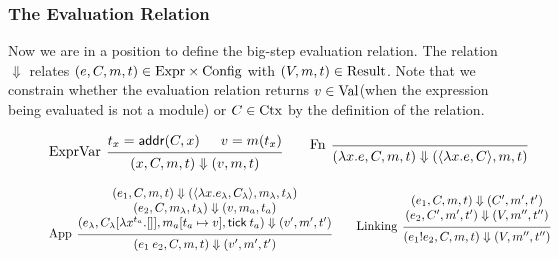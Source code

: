 \documentclass[acmsmall,screen,review]{acmart}
\theoremstyle{definition}
\newcommand*{\Expr}{\text{Expr}}
\newcommand*{\Time}{\mathbb{T}}
\newcommand*{\Ctx}[1]{\text{Ctx}\vphantom{#1}}
\newcommand*{\Value}[1]{\text{Val}\vphantom{#1}}
\newcommand*{\mem}{m}
\newcommand*{\Config}[1]{\text{Config}\vphantom{#1}}
\newcommand*{\Result}[1]{\text{Result}\vphantom{#1}}
\newcommand*{\link}[2]{{#1}\mathtt{!}{#2}}
\newcommand*{\addr}{\mathsf{addr}}
\newcommand*{\tick}{\mathsf{tick}}
\begin{document}
\subsubsection{The Evaluation Relation}

Now we are in a position to define the big-step evaluation relation.
The relation $\Downarrow$ relates $(e,C,\mem,t)\in\Expr\times\Config{\Time}$ with
$(V,\mem,t)\in\Result{\Time}$.
Note that we constrain whether the evaluation relation returns $v\in\Value{\Time}$(when the expression being evaluated is not a module) or $C\in\Ctx{\Time}$ by the definition of the relation.

\begin{figure}[h!]
  \begin{flushright}\fbox{$(e,C,\mem,t)\Downarrow(V,\mem',t')$}\end{flushright}
  \vspace{0pt} %
  \footnotesize
  \[
    \begin{prooftree}
      \hypo{t_{x}=\addr(C,x)}
      \hypo{v=\mem(t_{x})}
      \infer[left label=ExprVar]2{
      (x, C, \mem, t)
      \Downarrow
      (v, \mem, t)
      }
    \end{prooftree}\qquad
    \begin{prooftree}
      \infer[left label=Fn]0{
      (\lambda x.e, C, \mem, t)
      \Downarrow
      (\langle\lambda x.e, C\rangle, \mem, t)
      }
    \end{prooftree}
  \]

  \[
    \begin{prooftree}
      \hypo{
        \begin{matrix}
          (e_{1}, C, \mem, t)
          \Downarrow
          (\langle\lambda x.e_{\lambda}, C_{\lambda}\rangle, \mem_{\lambda}, t_{\lambda}) \\
          (e_{2}, C, \mem_{\lambda}, t_{\lambda})
          \Downarrow
          (v, \mem_{a}, t_{a})                                                            \\
          (e_{\lambda}, C_{\lambda}[\lambda x^{t_{a}}.[]], \mem_{a}[t_{a}\mapsto v], \tick\:t_{a})
          \Downarrow
          (v', \mem',t')
        \end{matrix}
      }
      \infer[left label={App}]1{
      (e_{1}\:e_{2}, C, \mem, t)
      \Downarrow
      (v', \mem',t')
      }
    \end{prooftree}\qquad
    \begin{prooftree}
      \hypo{
        \begin{matrix}
          (e_{1}, C, \mem, t)
          \Downarrow
          (C', \mem', t') \\
          (e_{2}, C', \mem', t')
          \Downarrow
          (V, \mem'', t'')
        \end{matrix}
      }
      \infer[left label=Linking]1{
      (\link{e_{1}}{e_{2}}, C, \mem, t)
      \Downarrow
      (V, \mem'', t'')
      }
    \end{prooftree}
  \]


\end{figure}
\end{document}
